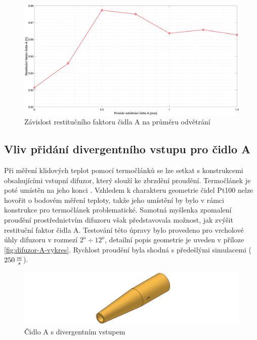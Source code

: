         \begin{figure}[ht!]
            \centering
            \includegraphics*[width=\textwidth]{400_SIMULACE_KONSTRUKCNICH_UPRAV/Grafy/07_prumer_odvetrani_A.eps}
            \caption{Závislost restitučního faktoru čidla A na průměru odvětrání}
            \label{fig:prumer-odvetrani-A}
        \end{figure}
    
    \newpage
    \subsection{Vliv přidání divergentního vstupu pro čidlo A}
        Při měření klidových teplot pomocí termočlánků se lze setkat s konstrukcemi obsahujícími vstupní difuzor, který slouží ke zbrzdění proudění. Termočlánek je poté umístěn na jeho konci \cite{Shapiro1954}. Vzhledem k charakteru geometrie čidel Pt100 nelze hovořit o bodovém měření teploty, takže jeho umístění by bylo v rámci konstrukce pro termočlánek problematické. Samotná myšlenka zpomalení proudění prostřednictvím difuzoru však představovala možnost, jak zvýšit restituční faktor čidla A. Testování této úpravy bylo provedeno pro vrcholové úhly difuzoru v rozmezí $2^o \div 12^o$, detailní popis geometrie je uveden v příloze \ref{fig:difuzor-A-vykres}. Rychlost proudění byla shodná s předešlými simulacemi ($250 \, \frac{m}{s}$).
        
        \begin{figure}[ht!]
            \centering
            \includegraphics[width=\textwidth]{400_SIMULACE_KONSTRUKCNICH_UPRAV/Vykresy_rendery/Difuzor_A.png}
            \caption{Čidlo A s divergentním vstupem}
            \label{fig:difuzor-A}
        \end{figure}

